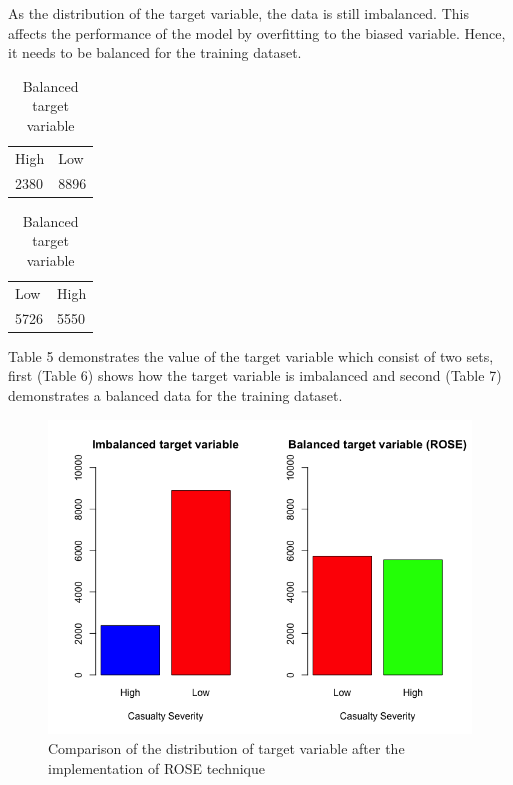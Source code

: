 \documentclass[
  a4paper,
]{article}
\begin{document}
As the distribution of the target variable, the data is still
imbalanced. This affects the performance of the model by overfitting to
the biased variable. Hence, it needs to be balanced for the training
dataset.

\begin{table}[!htb]
    \caption{Target Variable Casualty Severity}
    \begin{minipage}{.5\linewidth}
      \caption{Imbalanced target variable}
      \centering
        \begin{tabular}{l@{\hskip 0.5in}l@{\hskip 0.5in}}
           High & Low \\
              2380  & 8896\\
        \end{tabular}
    \end{minipage}
    \begin{minipage}{.5\linewidth}
      \centering
        \caption{Balanced target variable}
        \begin{tabular}{l@{\hskip 0.5in}l@{\hskip 0.5in}}
            Low  &  High \\
            5726 &  5550 \\
        \end{tabular}
    \end{minipage} 
\end{table}

Table 5 demonstrates the value of the target variable which consist of
two sets, first (Table 6) shows how the target variable is imbalanced
and second (Table 7) demonstrates a balanced data for the training
dataset.

\begin{figure}[h!]

{\centering \includegraphics[width=0.75\linewidth]{rose} 

}

\caption{Comparison of the distribution of target variable after the implementation of ROSE technique}\label{fig:unnamed-chunk-16}
\end{figure}
\end{document}
